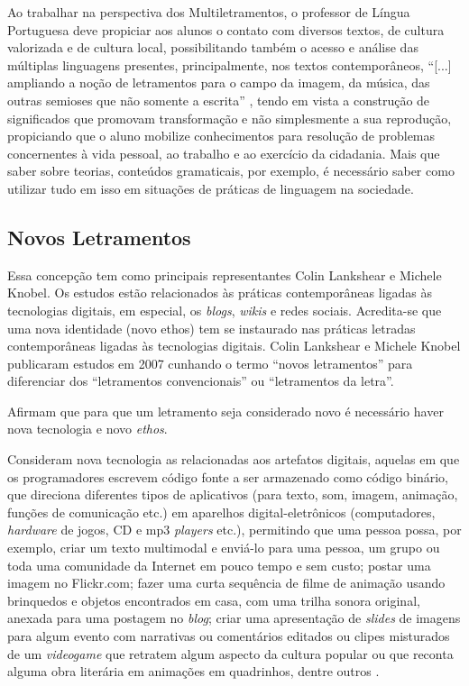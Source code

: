 \documentclass{textolivre}
\begin{document}
Ao trabalhar na perspectiva dos Multiletramentos, o professor de Língua
Portuguesa deve propiciar aos alunos o contato com diversos textos, de cultura
valorizada e de cultura local, possibilitando também o acesso e análise das
múltiplas linguagens presentes, principalmente, nos textos contemporâneos,
“[...] ampliando a noção de letramentos para o campo da imagem, da música, das
outras semioses que não somente a escrita” \cite[p. 107]{rojo2009}, tendo em vista
a construção de significados que promovam transformação e não simplesmente a
sua reprodução, propiciando que o aluno mobilize conhecimentos para resolução
de problemas concernentes à vida pessoal, ao trabalho e ao exercício da
cidadania. Mais que saber sobre teorias, conteúdos gramaticais, por exemplo, é
necessário saber como utilizar tudo em isso em situações de práticas de
linguagem na sociedade.


\subsection{Novos Letramentos}\label{sec-novos-letramentos}
Essa concepção tem como principais representantes Colin Lankshear e Michele
Knobel. Os estudos estão relacionados às práticas contemporâneas ligadas às
tecnologias digitais, em especial, os \emph{blogs}, \emph{wikis} e redes sociais. Acredita-se
que uma nova identidade (novo ethos) tem se instaurado nas práticas letradas
contemporâneas ligadas às tecnologias digitais. Colin Lankshear e Michele
Knobel publicaram estudos em 2007 cunhando o termo “novos letramentos” para
diferenciar dos “letramentos convencionais” ou “letramentos da letra”.

Afirmam que para que um letramento seja considerado novo é necessário haver nova tecnologia e novo \emph{ethos}.

Consideram nova tecnologia as relacionadas aos artefatos digitais, aquelas em
que os programadores escrevem código fonte a ser armazenado como código
binário, que direciona diferentes tipos de aplicativos (para texto, som,
imagem, animação, funções de comunicação etc.) em aparelhos digital-eletrônicos
(computadores, \emph{hardware} de jogos, CD e mp3 \emph{players} etc.), permitindo que uma
pessoa possa, por exemplo, criar um texto multimodal e enviá-lo para uma
pessoa, um grupo ou toda uma comunidade da Internet em pouco tempo e sem custo;
postar uma imagem no Flickr.com; fazer uma curta sequência de filme de animação
usando brinquedos e objetos encontrados em casa, com uma trilha sonora
original, anexada para uma postagem no \emph{blog}; criar uma apresentação de \emph{slides}
de imagens para algum evento com narrativas ou comentários editados ou clipes
misturados de um \emph{videogame} que retratem algum aspecto da cultura popular ou que
reconta alguma obra literária em animações em quadrinhos, dentre outros \cite{knobel2007}.
\end{document}
